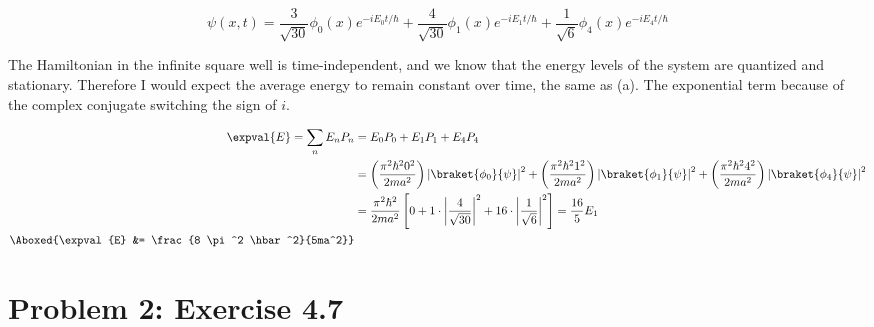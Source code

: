 \documentclass{article}
\begin{document}
\begin{enumerate}
		\begin{equation}
			\psi(x,t) = \frac{3}{\sqrt{30}} \phi_0 (x) e^{-i E_0 t/\hbar} + \frac{4}{\sqrt{30}} \phi_1 (x) e^{-i E_1 t/\hbar} + \frac{1}{\sqrt{6}} \phi_4 (x) e^{-i E_4 t/\hbar}
		\end{equation}
		
		The Hamiltonian in the infinite square well is time-independent, and we know that the energy levels of the system are quantized and stationary. Therefore I would expect the average energy to remain constant over time, the same as (a). The exponential term because of the complex conjugate switching the sign of $i$. 
		
		\begin{equation}
			\begin{split}
				\expval{E} = \sum_{n} E_n P_n &= E_0 P_0 + E_1 P_1 + E_4 P_4 \\
				&= \left( \frac{\pi^2 \hbar^2 0^2}{2ma^2} \right) \left| \braket{\phi_0}{\psi} \right|^2 + \left( \frac{\pi^2 \hbar^2 1^2}{2ma^2} \right) \left| \braket{\phi_1}{\psi} \right|^2 + \left( \frac{\pi^2 \hbar^2 4^2}{2ma^2} \right) \left| \braket{\phi_4}{\psi} \right|^2 \\
				&= \frac{\pi^2 \hbar^2}{2ma^2} \left[ 0 + 1 \cdot \left| \frac{4}{\sqrt{30}} \right|^2 + 16 \cdot \left| \frac{1}{\sqrt{6}} \right|^2 \right] = \frac{16}{5} E_1 \\
				\Aboxed{\expval{E} &= \frac{8 \pi^2 \hbar^2}{5ma^2}}
			\end{split}
		\end{equation}
		
	\end{enumerate}
				
\clearpage	
		
	\section*{Problem 2: Exercise 4.7}
	
\end{document}
